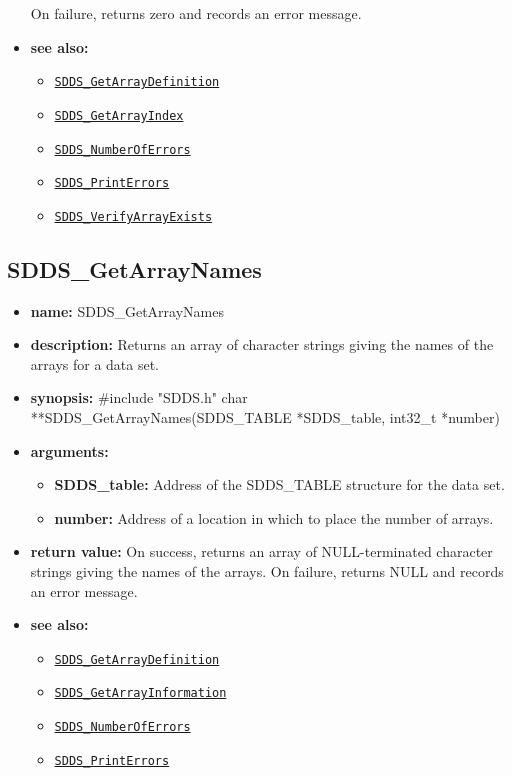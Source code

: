 \documentclass[11pt]{article}
\newcommand{\progref}[1]{\hyperref[SDDS_#1]{\tt SDDS\_#1}}
\begin{document}
\begin{itemize}
\newline
On failure, returns zero and records an error message. 
\item {\bf see also:}
\begin{itemize}
\item \progref{GetArrayDefinition}
\item \progref{GetArrayIndex}
\item \progref{NumberOfErrors}
\item \progref{PrintErrors}
\item \progref{VerifyArrayExists}
\end{itemize}
\end{itemize}

\subsection{SDDS\_GetArrayNames}
\label{SDDS_GetArrayNames}

\begin{itemize}
\item {\bf name:}\newline
SDDS\_GetArrayNames
\item {\bf description:}\newline
Returns an array of character strings giving the names of the arrays for a data set.
\item {\bf synopsis:} \#include "SDDS.h"\newline
char **SDDS\_GetArrayNames(SDDS\_TABLE *SDDS\_table, int32\_t *number)
\item {\bf arguments:}
\begin{itemize}
\item {\bf SDDS\_table:} Address of the SDDS\_TABLE structure for the data set.
\item {\bf number:} Address of a location in which to place the number of arrays.
\end{itemize}
\item {\bf return value:}\newline
On success, returns an array of NULL-terminated character strings giving the names of the arrays. On failure, returns NULL and records an error message.
\item {\bf see also:}
\begin{itemize}
\item \progref{GetArrayDefinition}
\item \progref{GetArrayInformation}
\item \progref{NumberOfErrors}
\item \progref{PrintErrors}
\end{itemize}
\end{itemize}
\end{document}
